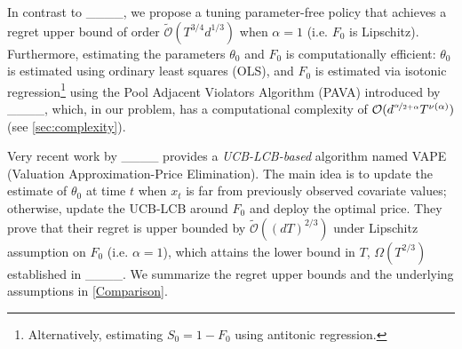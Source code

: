  
In contrast to ____, we propose a tuning parameter-free policy that achieves a regret upper bound of order $\widetilde{\mathcal{O}}(T^{3/4} d^{1/3})$ when $\alpha =1$ (i.e. $F_0$ is Lipschitz). Furthermore, estimating the parameters $\theta_0$ and $F_0$ is computationally efficient: $\theta_0$ is estimated using ordinary least squares (OLS), and $F_0$ is estimated via isotonic regression\footnote{Alternatively, estimating $S_0=1 - F_0$ using antitonic regression.} using the Pool Adjacent Violators Algorithm (PAVA) introduced by ____, which, in our problem, has a computational complexity of $\mathcal{O}(d^{\nicefrac{\alpha}{2+\alpha}}T^{\nu(\alpha)})$ (see \cref{sec:complexity}). 

Very recent work by ____ provides a \textit{UCB-LCB-based} algorithm named VAPE (Valuation Approximation-Price Elimination). The main idea is to update the estimate of $\theta_0$ at time $t$ when $x_t$ is far from previously observed covariate values; otherwise, update the UCB-LCB around $F_0$ and deploy the optimal price. They prove that their regret is upper bounded by $\widetilde{\mathcal{O}}((dT)^{2/3})$ under Lipschitz assumption on $F_0$ (i.e. $\alpha =1$), which attains the lower bound in $T$, $\Omega(T^{2/3})$ established in ____. We summarize the regret upper bounds and the underlying assumptions in \cref{Comparison}. 

